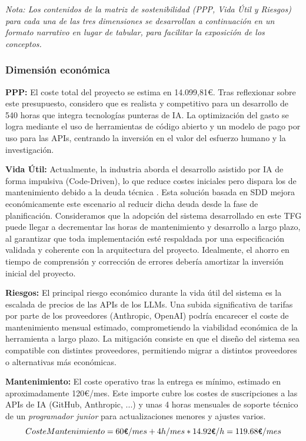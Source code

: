 \documentclass[11pt, letterpaper]{article}
\begin{document}
\textit{Nota: Los contenidos de la matriz de sostenibilidad (PPP, Vida Útil y Riesgos) para cada una de las tres dimensiones se desarrollan a continuación en un formato narrativo en lugar de tabular, para facilitar la exposición de los conceptos.}

\subsubsection{Dimensión económica}
\label{sec:dimension_economica}
\textbf{PPP:} El coste total del proyecto se estima en 14.099,81€. Tras reflexionar sobre este presupuesto, considero que es realista y competitivo para un desarrollo de 540 horas que integra tecnologías punteras de IA. La optimización del gasto se logra mediante el uso de herramientas de código abierto y un modelo de pago por uso para las APIs, centrando la inversión en el valor del esfuerzo humano y la investigación.

\textbf{Vida Útil:} Actualmente, la industria aborda el desarrollo asistido por IA de forma impulsiva (Code-Driven), lo que reduce costes iniciales pero dispara los de mantenimiento debido a la deuda técnica \cite{cunningham_1992_techdebt}. Esta solución basada en SDD mejora económicamente este escenario al reducir dicha deuda desde la fase de planificación. Consideramos que la adopción del sistema desarrollado en este TFG puede llegar a decrementar las horas de mantenimiento y desarrollo a largo plazo, al garantizar que toda implementación esté respaldada por una especificación validada y coherente con la arquitectura del proyecto. Idealmente, el ahorro en tiempo de comprensión y corrección de errores debería amortizar la inversión inicial del proyecto.

\textbf{Riesgos:} El principal riesgo económico durante la vida útil del sistema es la escalada de precios de las APIs de los LLMs. Una subida significativa de tarifas por parte de los proveedores (Anthropic, OpenAI) podría encarecer el coste de mantenimiento mensual estimado, comprometiendo la viabilidad económica de la herramienta a largo plazo. La mitigación consiste en que el diseño del sistema sea compatible con distintes proveedores, permitiendo migrar a distintos proveedores o alternativas más económicas.

\textbf{Mantenimiento:} El coste operativo tras la entrega es mínimo, estimado en aproximadamente 120€/mes. Este importe cubre los costes de suscripciones a las APIs de IA (GitHub, Anthropic, ...) y unas 4 horas mensuales de soporte técnico de un \textit{programador junior} para actualizaciones menores y ajustes varios.
\begin{equation}
    CosteMantenimiento = 60\verb|€|/mes + 4h/mes * 14{.}92\verb|€|/h = 119{.}68\verb|€|/mes
\end{equation}
\end{document}
